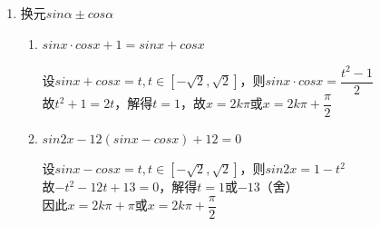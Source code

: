 \begin{enumerate}
\begin{enumerate}
\begin{enumerate}
\begin{jieda}
                方法同上. $x = \dfrac{\pi}{2}+2k\pi$或$-arctan\left(\dfrac{3}{4}\right)+2k\pi, k \in \mathbf{Z}$
            \end{jieda}
        \end{enumerate}
        \item 换元$sin\alpha \pm cos\alpha$
        \begin{enumerate}
            \item $sinx \cdot cosx + 1 = sinx + cosx$
            \begin{jieda}
                设$sinx + cosx = t, t \in [-\sqrt{2}, \sqrt{2}]$，则$sinx \cdot cosx = \dfrac{t^2 - 1}{2}$ \\
                故$t^2+1 = 2t$，解得$t = 1$，故$x = 2k\pi$或$x = 2k\pi + \dfrac{\pi}{2}$
            \end{jieda}
            \item $sin2x - 12(sinx - cosx) + 12 = 0$
            \begin{jieda}
                设$sinx - cosx = t, t \in [-\sqrt{2}, \sqrt{2}]$，则$sin2x = 1 - t^2$ \\
                故$- t^2 - 12t + 13 = 0$，解得$t = 1$或$-13$（舍）\\
                因此$x = 2k\pi + \pi$或$x = 2k\pi + \dfrac{\pi}{2}$
            \end{jieda}
        \end{enumerate}
    \end{enumerate}


\end{enumerate}
